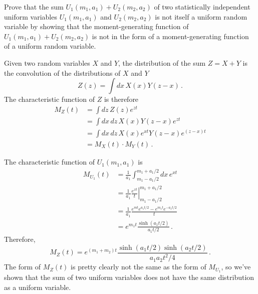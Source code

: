 

Prove that the sum $U_1(m_1, a_1) + U_2(m_2, a_2)$ of two statistically independent uniform variables $U_1(m_1, a_1)$ and $U_2(m_2, a_2)$ is not itself a uniform random variable by showing that the moment-generating function of $U_1(m_1, a_1) + U_2(m_2, a_2)$ is not in the form of a moment-generating function of a uniform random variable.


Given two random variables $X$ and $Y$, the distribution of the sum $Z = X + Y$ is the convolution of the distributions of $X$ and $Y$
\begin{equation*}
  Z(z) = \int dx \, X(x) Y(z - x) \, .
\end{equation*}
The characteristic function of $Z$ is therefore
\begin{align*}
  M_Z(t)
  &= \int dz \, Z(z) e^{zt} \\
  &= \int dx \, dz \, X(x) Y(z-x) e^{zt} \\
  &= \int dx \, dz \, X(x) e^{xt} Y(z-x) e^{(z-x)t} \\
  &= M_X(t) \cdot M_Y(t) \, .
\end{align*}

The characteristic function of $U_1(m_1, a_1)$ is
\begin{align*}
  M_{U_1}(t)
  &= \frac{1}{a_1} \int_{m_1 - a_1/2}^{m_1+a_1/2} dx \, e^{xt} \\
  &= \frac{1}{a_1} \left. \frac{e^{xt}}{t} \right \rvert _{m_1 - a_1/2}^{m_1 + a_1/2} \\
  &= \frac{1}{a_1} \frac{e^{mt} e^{a_1 t / 2} - e^{m_1 t} e^{-a_1 t / 2}}{t} \\
  &= e^{m_1 t} \frac{\sinh(a_1 t / 2)}{a_1 t / 2} \, .
\end{align*}
Therefore,
\begin{equation*}
  M_Z(t) = e^{(m_1 + m_2) t} \frac{\sinh(a_1 t / 2) \sinh(a_2 t / 2)}{a_1 a_2 t^2 / 4} \, .
\end{equation*}
The form of $M_Z(t)$ is pretty clearly not the same as the form of $M_{U_1}$, so we've shown that the sum of two uniform variables does not have the same distribution as a uniform variable.
